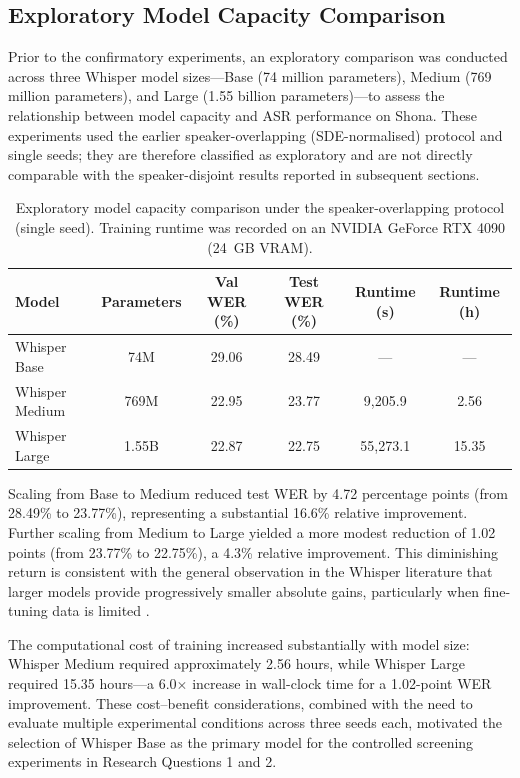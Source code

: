 \subsection{Exploratory Model Capacity Comparison}
\label{sec:model-capacity}

Prior to the confirmatory experiments, an exploratory comparison was conducted
across three Whisper model sizes---Base (74 million parameters), Medium (769
million parameters), and Large (1.55 billion parameters)---to assess the
relationship between model capacity and ASR performance on Shona. These
experiments used the earlier speaker-overlapping (SDE-normalised) protocol and
single seeds; they are therefore classified as exploratory and are not directly
comparable with the speaker-disjoint results reported in subsequent sections.

\begin{table}[H]
\centering
\caption{Exploratory model capacity comparison under the speaker-overlapping
protocol (single seed). Training runtime was recorded on an NVIDIA GeForce RTX
4090 (24~GB VRAM).}
\label{tab:model-capacity}
\begin{tabular}{lccccc}
\hline
\textbf{Model} & \textbf{Parameters} & \textbf{Val WER (\%)} & \textbf{Test WER (\%)} & \textbf{Runtime (s)} & \textbf{Runtime (h)} \\
\hline
Whisper Base  & 74M  & 29.06 & 28.49 & ---       & ---   \\
Whisper Medium & 769M & 22.95 & 23.77 & 9{,}205.9 & 2.56 \\
Whisper Large  & 1.55B & 22.87 & 22.75 & 55{,}273.1 & 15.35 \\
\hline
\end{tabular}
\end{table}

Scaling from Base to Medium reduced test WER by 4.72 percentage points (from
28.49\% to 23.77\%), representing a substantial 16.6\% relative improvement.
Further scaling from Medium to Large yielded a more modest reduction of 1.02
points (from 23.77\% to 22.75\%), a 4.3\% relative improvement. This
diminishing return is consistent with the general observation in the Whisper
literature that larger models provide progressively smaller absolute gains,
particularly when fine-tuning data is limited
\citep{Radford2023}.

The computational cost of training increased substantially with model size:
Whisper Medium required approximately 2.56 hours, while Whisper Large required
15.35 hours---a 6.0$\times$ increase in wall-clock time for a 1.02-point WER
improvement. These cost--benefit considerations, combined with the need to
evaluate multiple experimental conditions across three seeds each, motivated the
selection of Whisper Base as the primary model for the controlled screening
experiments in Research Questions 1 and 2.

